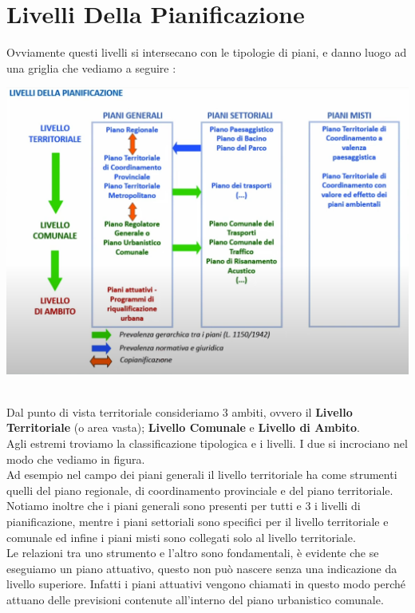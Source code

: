 \documentclass[a4paper,12pt, oneside]{book}
\begin{document}
\section{Livelli Della Pianificazione}
Ovviamente questi livelli si intersecano con le tipologie di piani, e danno luogo ad una griglia che vediamo a seguire :
\\
 \begin{center}
   \includegraphics[width=0.8\linewidth]{"immagini/livelli di pianificazione"}
   \label{fig:livelli di pianificazione}
 \end{center}
\leavevmode\\
Dal punto di vista territoriale consideriamo 3 ambiti, ovvero il \textbf{Livello Territoriale} (o area vasta); \textbf{Livello Comunale} e \textbf{Livello di Ambito}.\\
Agli estremi troviamo la classificazione tipologica e i livelli. I due si incrociano nel modo che vediamo in figura.\\
Ad esempio nel campo dei piani generali il livello territoriale ha come strumenti quelli del piano regionale, di coordinamento provinciale e del piano territoriale.\\
Notiamo inoltre che i piani generali sono presenti per tutti e 3 i livelli di pianificazione, mentre i piani settoriali sono specifici per il livello territoriale e comunale ed infine i piani misti sono collegati solo al livello territoriale.\\
Le relazioni tra uno strumento e l'altro sono fondamentali, è evidente che se eseguiamo un piano attuativo, questo non può nascere senza una indicazione da livello superiore. Infatti i piani attuativi vengono chiamati in questo modo perché attuano delle previsioni contenute all'interno del piano urbanistico comunale.\\
\end{document}
